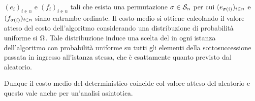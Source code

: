$(e_i)_{i \in n}$
e
$(f_i)_{i \in n}$
tali che esista una permutazione
$\Permutation \in \SymmetricGroup{n}$
per cui
$(e_{\Permutation(i)})_{i \in n}$
e
$(f_{\Permutation(i)})_{i \in n}$
siano entrambe ordinate. Il costo medio si ottiene calcolando il valore
atteso del costo dell'algoritmo considerando una distribuzione di probabilit\`a
uniforme si $\Omega$. Tale distribuzione induce una scelta del
 in ogni istanza dell'algoritmo con probabilit\`a uniforme
su tutti gli elementi della sottosuccessione passata in ingresso all'istanza
stessa, che \`e esattamente quanto previsto dal  aleatorio.
\par Dunque il costo medio del  deterministico coincide col
valore atteso del  aleatorio e questo vale anche per
un'analisi asintotica. \EndProof

